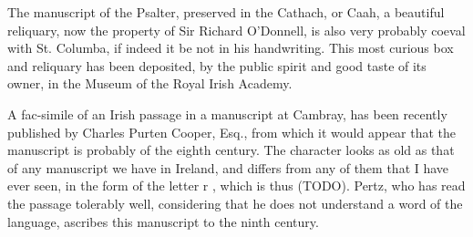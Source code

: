 \documentclass[11pt,oneside]{memoir}
\begin{document}
The manuscript of the Psalter, preserved in the Cathach, or Caah, a beautiful reliquary, now the property of Sir Richard O'Donnell, is also very probably coeval with St. Columba, if indeed it be not in his handwriting.
This most curious box and reliquary has been deposited, by the public spirit and good taste of its owner, in the Museum of the Royal Irish Academy.

A fac-simile of an Irish passage in a manuscript at Cambray, has been recently published by Charles Purten Cooper, Esq., from which it would appear that the manuscript is probably of the eighth century.
The character looks as old as that of any manuscript we have in Ireland, and differs from any of them that I have ever seen, in the form of the letter \gaelicfont r \normalfont, which is thus (TODO).
Pertz, who has read the passage tolerably well, considering that he does not understand a word of the language, ascribes this manuscript to the ninth century.
\end{document}
